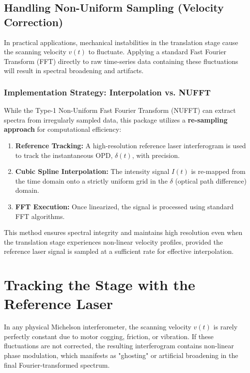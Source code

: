 \documentclass[8pt,a4paper]{article}
\begin{document}
	\subsection{Handling Non-Uniform Sampling (Velocity Correction)}
	In practical applications, mechanical instabilities in the translation stage cause the scanning velocity $v(t)$ to fluctuate. Applying a standard Fast Fourier Transform (FFT) directly to raw time-series data containing these fluctuations will result in spectral broadening and artifacts.
	
	\subsubsection{Implementation Strategy: Interpolation vs. NUFFT}
	While the Type-1 Non-Uniform Fast Fourier Transform (NUFFT) can extract spectra from irregularly sampled data, this package utilizes a \textbf{re-sampling approach} for computational efficiency:
	
	\begin{enumerate}
		\item \textbf{Reference Tracking:} A high-resolution reference laser interferogram is used to track the instantaneous OPD, $\delta(t)$, with precision.
	 	\item \textbf{Cubic Spline Interpolation:} The intensity signal $I(t)$ is re-mapped from the time domain onto a strictly uniform grid in the $\delta$ (optical path difference) domain.
	 	\item \textbf{FFT Execution:} Once linearized, the signal is processed using standard FFT algorithms.
	\end{enumerate}
	
	This method ensures spectral integrity and maintains high resolution even when the translation stage experiences non-linear velocity profiles, provided the reference laser signal is sampled at a sufficient rate for effective interpolation.
	
	\section{Tracking the Stage with the Reference Laser}
	In any physical Michelson interferometer, the scanning velocity $v(t)$ is rarely perfectly constant due to motor cogging, friction, or vibration. If these fluctuations are not corrected, the resulting interferogram contains non-linear phase modulation, which manifests as "ghosting" or artificial broadening in the final Fourier-transformed spectrum.
	
\end{document}
